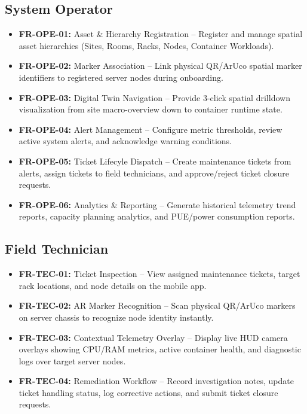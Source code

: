 \subsection{System Operator}
\begin{itemize}
    \item \textbf{FR-OPE-01:} Asset \& Hierarchy Registration -- Register and manage spatial asset hierarchies (Sites, Rooms, Racks, Nodes, Container Workloads).
    \item \textbf{FR-OPE-02:} Marker Association -- Link physical QR/ArUco spatial marker identifiers to registered server nodes during onboarding.
    \item \textbf{FR-OPE-03:} Digital Twin Navigation -- Provide 3-click spatial drilldown visualization from site macro-overview down to container runtime state.
    \item \textbf{FR-OPE-04:} Alert Management -- Configure metric thresholds, review active system alerts, and acknowledge warning conditions.
    \item \textbf{FR-OPE-05:} Ticket Lifecyle Dispatch -- Create maintenance tickets from alerts, assign tickets to field technicians, and approve/reject ticket closure requests.
    \item \textbf{FR-OPE-06:} Analytics \& Reporting -- Generate historical telemetry trend reports, capacity planning analytics, and PUE/power consumption reports.
\end{itemize}

\subsection{Field Technician}
\begin{itemize}
    \item \textbf{FR-TEC-01:} Ticket Inspection -- View assigned maintenance tickets, target rack locations, and node details on the mobile app.
    \item \textbf{FR-TEC-02:} AR Marker Recognition -- Scan physical QR/ArUco markers on server chassis to recognize node identity instantly.
    \item \textbf{FR-TEC-03:} Contextual Telemetry Overlay -- Display live HUD camera overlays showing CPU/RAM metrics, active container health, and diagnostic logs over target server nodes.
    \item \textbf{FR-TEC-04:} Remediation Workflow -- Record investigation notes, update ticket handling status, log corrective actions, and submit ticket closure requests.
\end{itemize}

